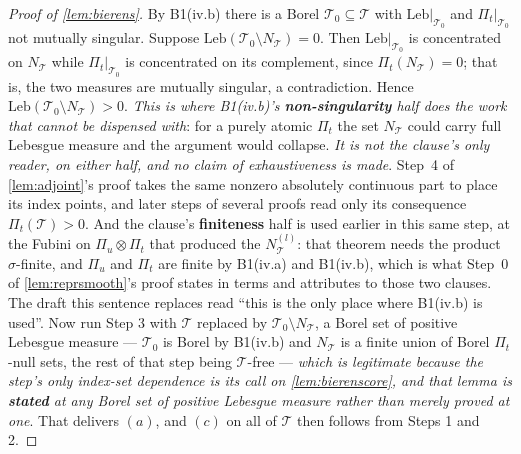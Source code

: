 \begin{proof}[Proof of \cref{lem:bierens}]
By B1(iv.b) there is a Borel $\mathcal T_0\subseteq\mathcal T$ with $\mathrm{Leb}|_{\mathcal T_0}$ and
$\Pi_t|_{\mathcal T_0}$ not mutually singular. Suppose $\mathrm{Leb}(\mathcal T_0\setminus N_{\mathcal T})=0$.
Then $\mathrm{Leb}|_{\mathcal T_0}$ is concentrated on $N_{\mathcal T}$ while
$\Pi_t|_{\mathcal T_0}$ is concentrated on its complement, since $\Pi_t(N_{\mathcal T})=0$; that is, the
two measures are mutually singular, a contradiction. Hence
$\mathrm{Leb}(\mathcal T_0\setminus N_{\mathcal T})>0$. \emph{This is where B1(iv.b)'s
\textbf{non-singularity} half does the work that cannot be dispensed with}: for a purely atomic
$\Pi_t$ the set $N_{\mathcal T}$ could carry
full Lebesgue measure and the argument would collapse. \emph{It is not the clause's only reader, on
either half, and no claim of exhaustiveness is made}. Step~4 of \cref{lem:adjoint}'s proof takes the
same nonzero absolutely continuous part to place its index points, and later steps of several proofs
read only its consequence $\Pi_t(\mathcal T)>0$. And the clause's \textbf{finiteness} half is used
earlier in this same step, at the Fubini on $\Pi_u\otimes\Pi_t$ that produced the
$N^{(l)}_{\mathcal T}$: that theorem needs the product $\sigma$-finite, and $\Pi_u$ and $\Pi_t$ are
finite by B1(iv.a) and B1(iv.b), which is what Step~0 of \cref{lem:reprsmooth}'s proof states in
terms and attributes to those two clauses. The draft this sentence replaces read ``this is the only
place where B1(iv.b) is used''. Now run Step 3 with $\mathcal T$ replaced by
$\mathcal T_0\setminus N_{\mathcal T}$, a Borel set of positive Lebesgue measure ---
$\mathcal T_0$ is Borel by B1(iv.b) and $N_{\mathcal T}$ is a finite union of Borel $\Pi_t$-null sets,
the rest of that step being $\mathcal T$-free ---
\emph{which is legitimate because the step's only index-set dependence is its call on
\cref{lem:bierenscore}, and that lemma is \textbf{stated} at any Borel set of positive Lebesgue measure
rather than merely proved at one}. That delivers $(a)$, and $(c)$ on all of
$\mathcal T$ then follows from Steps 1 and 2.
\end{proof}

